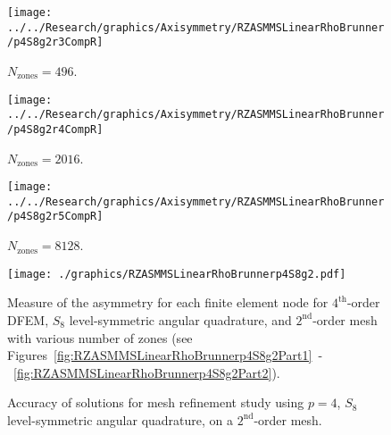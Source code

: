 \documentclass[12pt]{article}
\begin{document}
\begin{sidewaysfigure}[!htb]
\centering
\begin{subfigure}{0.33\textwidth}
\texttt{[image: ../../Research/graphics/Axisymmetry/RZASMMSLinearRhoBrunner/p4S8g2r3CompR]}
\caption{$N_\text{zones}=496$.}
\end{subfigure}%
\begin{subfigure}{0.33\textwidth}
\texttt{[image: ../../Research/graphics/Axisymmetry/RZASMMSLinearRhoBrunner/p4S8g2r4CompR]}
\caption{$N_\text{zones}=2016$.}
\end{subfigure}%
\begin{subfigure}{0.33\textwidth}
\texttt{[image: ../../Research/graphics/Axisymmetry/RZASMMSLinearRhoBrunner/p4S8g2r5CompR]}
\caption{$N_\text{zones}=8128$.}
\end{subfigure}
\caption{Relative asymmetry for $p=4$ finite elements on a $2^\text{nd}$-order mesh for $S_8$ level-symmetric angular quadrature; mesh overlay may be removed for clarity.}
\label{fig:RZASMMSLinearRhoBrunnerp4S8g2Part2}
\end{sidewaysfigure}

\begin{figure}[!htb]
\centering
\texttt{[image: ./graphics/RZASMMSLinearRhoBrunnerp4S8g2.pdf]}
\caption{Measure of the asymmetry for each finite element node for $4^\text{th}$-order DFEM, $S_8$ level-symmetric angular quadrature, and $2^\text{nd}$-order mesh with various number of zones (see Figures~\ref{fig:RZASMMSLinearRhoBrunnerp4S8g2Part1}~-~\ref{fig:RZASMMSLinearRhoBrunnerp4S8g2Part2}).}
\label{fig:RZASMMSLinearRhoBrunnerp4S8g2Nodes}
\end{figure}

\begin{figure}[!htb]
\centering
{}
\caption{Accuracy of solutions for mesh refinement study using $p=4$, $S_8$ level-symmetric angular quadrature, on a $2^\text{nd}$-order mesh.}
\label{fig:RZASMMSLinearRhoBrunnerp4S8g2Accuracy}
\end{figure}
\end{document}
